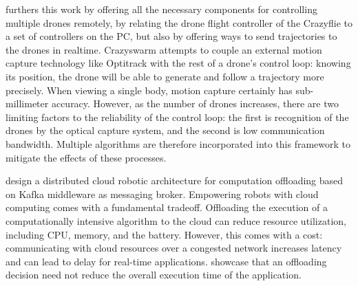 \cite{preiss_hönig_sukhatme_ayanian_2017} \hspace*{0.3cm} \textit{}
\hspace*{0.5cm} furthers this work by offering all the necessary components for controlling multiple drones remotely, by relating the drone flight controller of the Crazyflie to a set of controllers on the PC, but also by offering ways to send trajectories to the drones in realtime.  Crazyswarm attempts to couple an external motion capture technology like Optitrack with the rest of a drone’s control loop: knowing its position, the drone will be able to generate and follow a trajectory more precisely. When viewing a single body, motion capture certainly has sub-millimeter accuracy. However, as the number of drones increases, there are two limiting factors to the reliability of the control loop: the first is recognition of the drones by the optical capture system, and the second is low communication bandwidth. Multiple algorithms are therefore incorporated into this framework to mitigate the effects of these processes. 

\cite{chaari_cheikhrouhou_koubâa_youssef_hmam_2021} \hspace*{0.3cm} \textit{}
\hspace*{0.5cm}  design a distributed cloud robotic architecture  for computation offloading based on Kafka  middleware as messaging broker. Empowering robots with cloud computing comes with a fundamental tradeoff. Offloading the execution of a computationally intensive algorithm to the cloud can reduce resource
utilization, including CPU, memory, and the battery. However, this comes with a cost: communicating with cloud resources over a congested network increases latency and can lead to delay for real-time applications. \textit{} showcase that an offloading decision need not reduce the overall execution time of the application.




